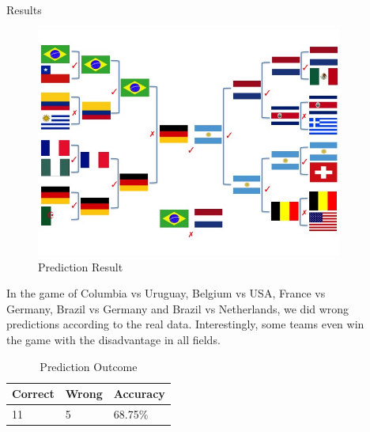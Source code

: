 \documentclass[final]{beamer}
\newlength{\sepwid}
\newlength{\onecolwid}
\newlength{\twocolwid}
\begin{document}
\begin{frame}[t]
\begin{columns}[t]
\begin{column}{\twocolwid}
\begin{columns}[t,totalwidth=\twocolwid]
\begin{column}{\onecolwid}
\begin{block}{Results}
\begin{figure}
\includegraphics[width=0.8\linewidth]{Slide3.jpg}
\caption{Prediction Result}
\end{figure}
In the game of Columbia vs Uruguay, Belgium vs USA, France vs Germany, Brazil vs Germany and Brazil vs Netherlands, we did wrong predictions according to the real data. Interestingly, some teams even win the game with the disadvantage in all fields.

\begin{table}
\vspace{0ex}
\begin{tabular}{l l l}
\toprule
\textbf{Correct} & \textbf{Wrong} & \textbf{Accuracy}\\
\midrule
11 & 5 & 68.75\% \\
\bottomrule
\end{tabular}
\caption{Prediction Outcome}
\end{table}

\end{block}


\end{column} %

\end{columns} %

\end{column} %

\begin{column}{\sepwid}\end{column} %

\begin{column}{\onecolwid} %


\end{column}
\end{columns}
\end{frame}
\end{document}
